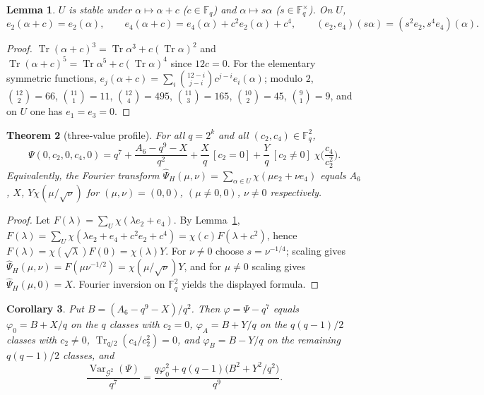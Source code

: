 \documentclass[11pt,a4paper]{amsart}
\newtheorem{theorem}{Theorem}[section]
\newtheorem{lemma}[theorem]{Lemma}
\newtheorem{corollary}[theorem]{Corollary}
\theoremstyle{definition}
\newcommand{\F}{\mathbb{F}}
\newcommand{\G}{\mathcal{G}}
\newcommand{\Tr}{\operatorname{Tr}}
\newcommand{\Var}{\operatorname{Var}}
\begin{document}
\begin{lemma}\label{lem:sym}
$U$ is stable under $\alpha\mapsto\alpha+c$ ($c\in\F_q$) and $\alpha\mapsto s\alpha$ ($s\in\F_q^\times$). On $U$,
\[
e_2(\alpha+c)=e_2(\alpha),\qquad e_4(\alpha+c)=e_4(\alpha)+c^2e_2(\alpha)+c^4,\qquad (e_2,e_4)(s\alpha)=(s^2e_2,s^4e_4)(\alpha).
\]
\end{lemma}
\begin{proof}
$\Tr(\alpha+c)^3=\Tr\alpha^3+c(\Tr\alpha)^2$ and $\Tr(\alpha+c)^5=\Tr\alpha^5+c(\Tr\alpha)^4$ since $12c=0$. For the elementary symmetric functions, $e_j(\alpha+c)=\sum_i\binom{12-i}{j-i}c^{j-i}e_i(\alpha)$; modulo $2$, $\binom{12}2=66$, $\binom{11}1=11$, $\binom{12}4=495$, $\binom{11}3=165$, $\binom{10}2=45$, $\binom91=9$, and on $U$ one has $e_1=e_3=0$.
\end{proof}

\begin{theorem}[three-value profile]\label{thm:threevalue}
For all $q=2^k$ and all $(c_2,c_4)\in\F_q^2$,
\[
\Psi(0,c_2,0,c_4,0)=q^7+\frac{A_6-q^9-X}{q^2}+\frac Xq\,[c_2=0]+\frac Yq\,[c_2\ne0]\;\chi\Big(\frac{c_4}{c_2^2}\Big).
\]
Equivalently, the Fourier transform $\widehat\Psi_H(\mu,\nu)=\sum_{\alpha\in U}\chi(\mu e_2+\nu e_4)$ equals $A_6$, $X$, $Y\chi(\mu/\sqrt\nu)$ for $(\mu,\nu)=(0,0)$, $(\mu\ne0,0)$, $\nu\ne0$ respectively.
\end{theorem}
\begin{proof}
Let $F(\lambda)=\sum_U\chi(\lambda e_2+e_4)$. By Lemma~\ref{lem:sym}, $F(\lambda)=\sum_U\chi(\lambda e_2+e_4+c^2e_2+c^4)=\chi(c)F(\lambda+c^2)$, hence $F(\lambda)=\chi(\sqrt\lambda)F(0)=\chi(\lambda)Y$. For $\nu\ne0$ choose $s=\nu^{-1/4}$; scaling gives $\widehat\Psi_H(\mu,\nu)=F(\mu\nu^{-1/2})=\chi(\mu/\sqrt\nu)Y$, and for $\mu\ne0$ scaling gives $\widehat\Psi_H(\mu,0)=X$. Fourier inversion on $\F_q^2$ yields the displayed formula.
\end{proof}

\begin{corollary}\label{cor:profile}
Put $B=(A_6-q^9-X)/q^2$. Then $\varphi=\Psi-q^7$ equals $\varphi_0=B+X/q$ on the $q$ classes with $c_2=0$, $\varphi_A=B+Y/q$ on the $q(q-1)/2$ classes with $c_2\ne0$, $\Tr_{q/2}(c_4/c_2^2)=0$, and $\varphi_B=B-Y/q$ on the remaining $q(q-1)/2$ classes, and
\begin{equation}\label{eq:varH6}
\frac{\Var_{\G^2}(\Psi)}{q^7}=\frac{q\varphi_0^2+q(q-1)\bigl(B^2+Y^2/q^2\bigr)}{q^9}.
\end{equation}
\end{corollary}
\end{document}
